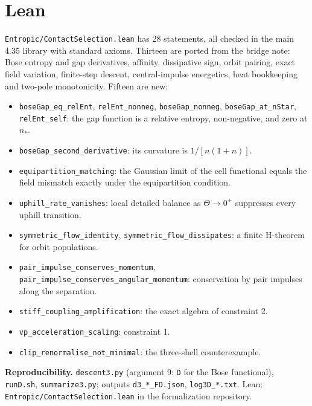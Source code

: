 \section*{Lean}
\texttt{Entropic/ContactSelection.lean} has 28 statements, all checked in the main 4.35 library with standard axioms. Thirteen are ported from the bridge note: Bose entropy and gap derivatives, affinity, dissipative sign, orbit pairing, exact field variation, finite-step descent, central-impulse energetics, heat bookkeeping and two-pole monotonicity. Fifteen are new:
\begin{itemize}
\item \texttt{boseGap\_eq\_relEnt}, \texttt{relEnt\_nonneg}, \texttt{boseGap\_nonneg}, \texttt{boseGap\_at\_nStar}, \texttt{relEnt\_self}: the gap function is a relative entropy, non-negative, and zero at $n_*$.
\item \texttt{boseGap\_second\_derivative}: its curvature is $1/[n(1+n)]$.
\item \texttt{equipartition\_matching}: the Gaussian limit of the cell functional equals the field mismatch exactly under the equipartition condition.
\item \texttt{uphill\_rate\_vanishes}: local detailed balance as $\Theta\to0^+$ suppresses every uphill transition.
\item \texttt{symmetric\_flow\_identity}, \texttt{symmetric\_flow\_dissipates}: a finite H-theorem for orbit populations.
\item \texttt{pair\_impulse\_conserves\_momentum}, \texttt{pair\_impulse\_conserves\_angular\_momentum}: conservation by pair impulses along the separation.
\item \texttt{stiff\_coupling\_amplification}: the exact algebra of constraint 2.
\item \texttt{vp\_acceleration\_scaling}: constraint 1.
\item \texttt{clip\_renormalise\_not\_minimal}: the three-shell counterexample.
\end{itemize}

\textbf{Reproducibility.} \texttt{descent3.py} (argument 9: \texttt{D} for the Bose functional), \texttt{runD.sh}, \texttt{summarize3.py}; outputs \texttt{d3\_*\_FD.json}, \texttt{log3D\_*.txt}. Lean: \texttt{Entropic/ContactSelection.lean} in the formalization repository.
